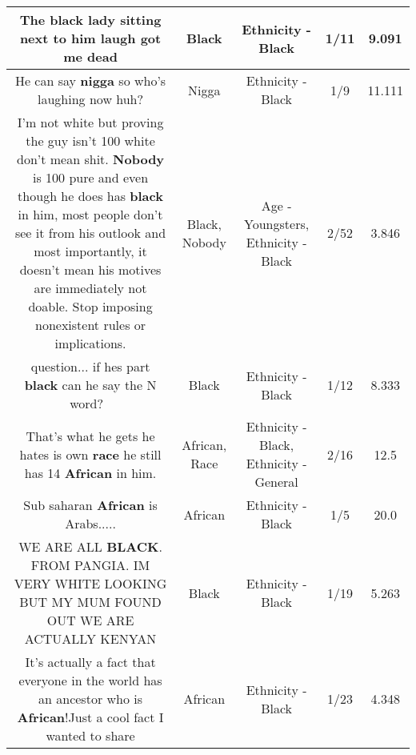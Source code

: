 \documentclass[11pt]{article}
\newlength\mylength
\begin{document}
\begin{center}
\begin{longtable}{|C{.65\mylength}|C{.30\mylength}|C{.12\mylength}|C{.12\mylength}|C{.12\mylength}|}
  \small The \textbf{black} lady sitting next to him laugh got me dead\normalsize   & Black & Ethnicity - Black & 1/11 & 9.091 \\  \hline
  \small He can say \textbf{nigga} so who's laughing now huh?\normalsize   & Nigga & Ethnicity - Black & 1/9 & 11.111 \\  \hline
  \small I'm not white but proving the guy isn't 100 white don't mean shit. \textbf{Nobody} is 100 pure and even though he does has \textbf{black} in him, most people don't see it from his outlook and most importantly, it doesn't mean his motives are immediately not doable. Stop imposing nonexistent rules or implications.\normalsize   & Black, Nobody & Age - Youngsters, Ethnicity - Black & 2/52 & 3.846 \\  \hline
  \small question... if hes part \textbf{black} can he say the N word? 🤔\normalsize   & Black & Ethnicity - Black & 1/12 & 8.333 \\  \hline
  \small That's what he gets he hates is own \textbf{race} he still has 14 \textbf{African} in him.\normalsize   & African, Race & Ethnicity - Black, Ethnicity - General & 2/16 & 12.5 \\  \hline
  \small Sub saharan \textbf{African} is Arabs.....\normalsize   & African & Ethnicity - Black & 1/5 & 20.0 \\  \hline
  \small WE ARE ALL \textbf{BLACK}. FROM PANGIA. IM VERY WHITE LOOKING BUT MY MUM FOUND OUT WE ARE ACTUALLY KENYAN\normalsize   & Black & Ethnicity - Black & 1/19 & 5.263 \\  \hline
  \small It's actually a fact that everyone in the world has an ancestor who is \textbf{African}!Just a cool fact I wanted to share\normalsize   & African & Ethnicity - Black & 1/23 & 4.348 \\  \hline

\end{longtable}
\end{center}
\end{document}
